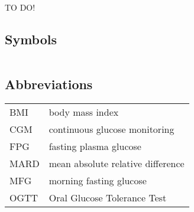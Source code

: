 \documentclass[english, 12pt, a4paper, elec, utf8, a-1b, online]{aaltothesis}
\date{31.1.2023}
\begin{document}
\makecoverpage


\makecopyrightpage


\begin{abstractpage}[english]
    \abstracttext{}
\end{abstractpage}

\newpage

\begin{abstractpage}[swedish]
TO DO!
\end{abstractpage}





\thesistableofcontents



\subsection*{Symbols}

\begin{tabular}{ll}

\end{tabular}

\subsection*{Abbreviations}

\begin{tabular}{ll}
BMI         & body mass index \\
CGM      & continuous glucose monitoring \\
FPG        & fasting plasma glucose \\
MARD        &  mean absolute relative difference \\
MFG         & morning fasting glucose \\
OGTT        & Oral Glucose Tolerance Test \\
\end{tabular}
\end{document}
